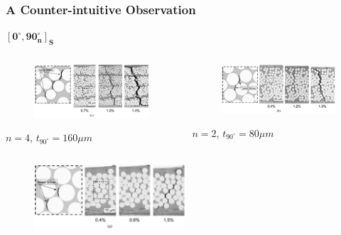 \documentclass[first,firstsupp,lastsupp,last,hyperref,table]{ETHclass}
\begin{document}
\begin{frame}
\frametitle{\vspace{0.3cm}\small A Counter-intuitive Observation}
\vspace{-0.5cm}
\centering
\tiny
$\mathbf{\left[0^{\circ}, 90^{\circ}_{n}\right]_{S}}$
\vspace{-0.25cm}
\begin{columns}[c]
\begin{column}{0.5\textwidth}
\centering
\begin{figure}
\centering
\includegraphics[width=\columnwidth]{saito-thick.png}
\end{figure}
\vspace{-0.4cm}
$n=4$, $t_{90^{\circ}}=160\mu m$
\end{column}
\begin{column}{0.5\textwidth}
\centering
\begin{figure}
\centering
\includegraphics[width=\columnwidth]{saito-mid.png}
\end{figure}
\vspace{-0.4cm}
$n=2$, $t_{90^{\circ}}=80\mu m$
\end{column}
\end{columns}
\vspace{-0.1cm}
\centering
\begin{figure}
\centering
\includegraphics[width=0.5\textwidth]{saito-thin.png}

\end{figure}
\end{frame}
\end{document}

